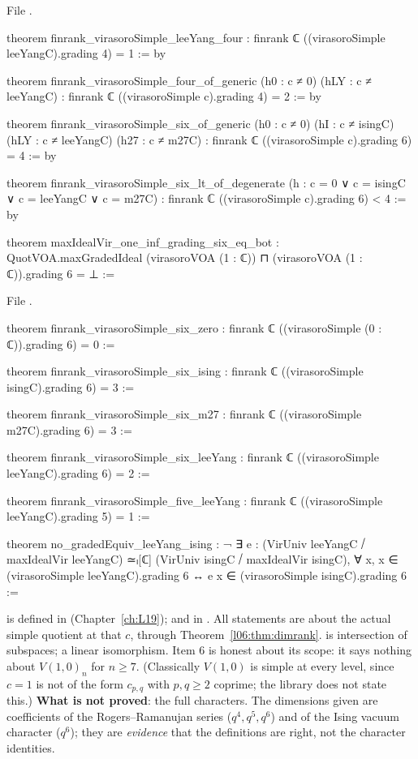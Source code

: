 File .
\begin{leancode}
theorem finrank_virasoroSimple_leeYang_four :
    finrank ℂ ((virasoroSimple leeYangC).grading 4) = 1 := by

theorem finrank_virasoroSimple_four_of_generic (h0 : c ≠ 0) (hLY : c ≠ leeYangC) :
    finrank ℂ ((virasoroSimple c).grading 4) = 2 := by

theorem finrank_virasoroSimple_six_of_generic (h0 : c ≠ 0) (hI : c ≠ isingC)
    (hLY : c ≠ leeYangC) (h27 : c ≠ m27C) :
    finrank ℂ ((virasoroSimple c).grading 6) = 4 := by

theorem finrank_virasoroSimple_six_lt_of_degenerate
    (h : c = 0 ∨ c = isingC ∨ c = leeYangC ∨ c = m27C) :
    finrank ℂ ((virasoroSimple c).grading 6) < 4 := by

theorem maxIdealVir_one_inf_grading_six_eq_bot :
    QuotVOA.maxGradedIdeal (virasoroVOA (1 : ℂ)) ⊓ (virasoroVOA (1 : ℂ)).grading 6 = ⊥ :=
\end{leancode}
File .
\begin{leancode}
theorem finrank_virasoroSimple_six_zero :
    finrank ℂ ((virasoroSimple (0 : ℂ)).grading 6) = 0 :=

theorem finrank_virasoroSimple_six_ising :
    finrank ℂ ((virasoroSimple isingC).grading 6) = 3 :=

theorem finrank_virasoroSimple_six_m27 :
    finrank ℂ ((virasoroSimple m27C).grading 6) = 3 :=

theorem finrank_virasoroSimple_six_leeYang :
    finrank ℂ ((virasoroSimple leeYangC).grading 6) = 2 :=

theorem finrank_virasoroSimple_five_leeYang :
    finrank ℂ ((virasoroSimple leeYangC).grading 5) = 1 :=

theorem no_gradedEquiv_leeYang_ising :
    ¬ ∃ e : (VirUniv leeYangC ⧸ maxIdealVir leeYangC) ≃ₗ[ℂ] (VirUniv isingC ⧸ maxIdealVir isingC),
        ∀ x, x ∈ (virasoroSimple leeYangC).grading 6 ↔ e x ∈ (virasoroSimple isingC).grading 6 :=
\end{leancode}

\begin{dictionary}
 is defined in 
(Chapter~\ref{ch:L19});  and  in . All statements are
about the actual simple quotient  at that $c$, through
Theorem~\ref{l06:thm:dimrank}.  is intersection of subspaces;  a linear isomorphism.
Item 6 is honest about its scope: it says nothing about $V(1,0)_n$ for $n\ge7$. (Classically $V(1,0)$ is
simple at every level, since $c = 1$ is not of the form $c_{p,q}$ with $p,q\ge2$ coprime; the library does
not state this.) \textbf{What is not proved}: the full
characters. The dimensions given are coefficients of the Rogers--Ramanujan series ($q^4,q^5,q^6$) and of the
Ising vacuum character ($q^6$); they are \emph{evidence} that the definitions are right, not the character
identities.
\end{dictionary}


